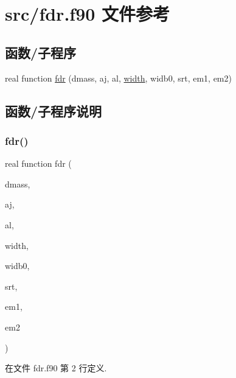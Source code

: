 \hypertarget{fdr_8f90}{}\section{src/fdr.f90 文件参考}
\label{fdr_8f90}
\subsection*{函数/子程序}
\begin{DoxyCompactItemize}
\item 
real function \mbox{\hyperlink{fdr_8f90_a265aefc3c77f64d953925eeffb957a69}{fdr}} (dmass, aj, al, \mbox{\hyperlink{width_8f90_ad87dba8131333d4eb15220ebfac774e8}{width}}, widb0, srt, em1, em2)
\end{DoxyCompactItemize}


\subsection{函数/子程序说明}
\mbox{\label{fdr_8f90_a265aefc3c77f64d953925eeffb957a69}} 
\subsubsection{\texorpdfstring{fdr()}{fdr()}}
{\footnotesize\ttfamily real function fdr (\begin{DoxyParamCaption}\item[{}]{dmass,  }\item[{}]{aj,  }\item[{}]{al,  }\item[{}]{width,  }\item[{}]{widb0,  }\item[{}]{srt,  }\item[{}]{em1,  }\item[{}]{em2 }\end{DoxyParamCaption})}



在文件 fdr.\+f90 第 2 行定义.

